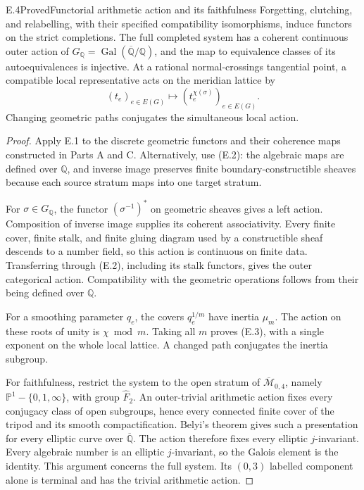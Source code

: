 \begin{result}{E.4}{Proved}{Functorial arithmetic action and its faithfulness}
Forgetting, clutching, and relabelling, with their specified
compatibility isomorphisms, induce functors on the strict completions.
The full completed system has a coherent continuous outer action of
$G_{\mathbb Q}=\operatorname{Gal}(\overline{\mathbb Q}/\mathbb Q)$,
and the map to equivalence classes of its autoequivalences is injective.
At a rational normal-crossings tangential point, a compatible local
representative acts on the meridian lattice by
\[
 (t_e)_{e\in E(G)}\longmapsto
                 (t_e^{\chi(\sigma)})_{e\in E(G)} .           \tag{E.3}
\]
Changing geometric paths conjugates the simultaneous local action.
\end{result}
\begin{proof}
Apply E.1 to the discrete geometric functors and their coherence maps
constructed in Parts A and C.  Alternatively, use (E.2): the algebraic
maps are defined over $\mathbb Q$, and inverse image preserves finite
boundary-constructible sheaves because each source stratum maps into
one target stratum.

For $\sigma\in G_{\mathbb Q}$, the functor $(\sigma^{-1})^*$ on
geometric sheaves gives a left action.  Composition of inverse image
supplies its coherent associativity.  Every finite cover, finite stalk,
and finite gluing diagram used by a constructible sheaf descends to a
number field, so this action is continuous on finite data.  Transferring
through (E.2), including its stalk functors, gives the outer categorical
action.  Compatibility with the geometric operations follows from
their being defined over $\mathbb Q$.

For a smoothing parameter $q_e$, the covers $q_e^{1/m}$ have inertia
$\mu_m$.  The action on these roots of unity is $\chi\bmod m$.
Taking all $m$ proves (E.3), with a single exponent on the whole
local lattice.  A changed path conjugates the inertia subgroup.

For faithfulness, restrict the system to the open stratum of
$\overline{\mathcal M}_{0,4}$, namely
$\mathbb P^1-\{0,1,\infty\}$, with group $\widehat F_2$.
An outer-trivial arithmetic action fixes every conjugacy class of open
subgroups, hence every connected finite cover of the tripod and its
smooth compactification.  Belyi's theorem gives such a presentation
for every elliptic curve over $\overline{\mathbb Q}$.  The action
therefore fixes every elliptic $j$-invariant.  Every algebraic number
is an elliptic $j$-invariant, so the Galois element is the identity.
This argument concerns the full system.  Its $(0,3)$ labelled component
alone is terminal and has the trivial arithmetic action.
\end{proof}

